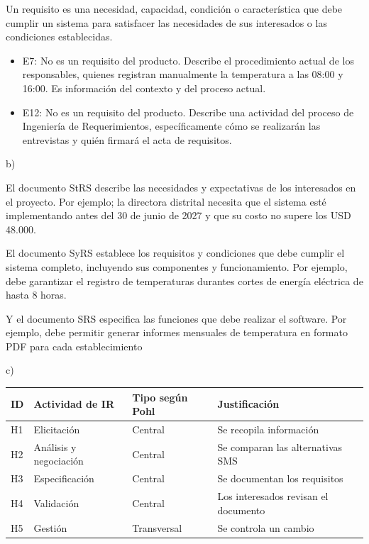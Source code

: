 \documentclass[11pt]{article}
\renewcommand{\arraystretch}{1.25}
\begin{document}
Un requisito es una necesidad, capacidad, condición o característica que debe cumplir un sistema para satisfacer las necesidades de sus interesados o las condiciones establecidas.

\begin{itemize}[leftmargin=18pt,itemsep=2pt]
\item E7: No es un requisito del producto. Describe el procedimiento actual de los responsables, quienes registran manualmente la temperatura a las 08:00 y 16:00. Es información del contexto y del proceso actual.
\item E12: No es un requisito del producto. Describe una actividad del proceso de Ingeniería de Requerimientos, específicamente cómo se realizarán las entrevistas y quién firmará el acta de requisitos.
\end{itemize}

b)

El documento StRS describe las necesidades y expectativas de los interesados en el proyecto. Por ejemplo; la directora distrital necesita que el sistema esté implementando antes del 30 de junio de 2027 y que su costo no supere los USD 48.000.

El documento SyRS establece los requisitos y condiciones que debe cumplir el sistema completo, incluyendo sus componentes y funcionamiento. Por ejemplo, debe garantizar el registro de temperaturas durantes cortes de energía eléctrica de hasta 8 horas.

Y el documento SRS especifica las funciones que debe realizar el software. Por ejemplo, debe permitir generar informes mensuales de temperatura en formato PDF para cada establecimiento

c)

{\renewcommand{\arraystretch}{1.6}
\noindent\begin{tabularx}{\linewidth}{|l|l|l|Y|}
\hline
ID & Actividad de IR & Tipo según Pohl & Justificación\\ \hline
H1 & Elicitación & Central & Se recopila información\\ \hline
H2 & Análisis y negociación & Central & Se comparan las alternativas SMS\\ \hline
H3 & Especificación & Central & Se documentan los requisitos\\ \hline
H4 & Validación & Central & Los interesados revisan el documento\\ \hline
H5 & Gestión & Transversal & Se controla un cambio\\ \hline
\end{tabularx}}
\end{document}
